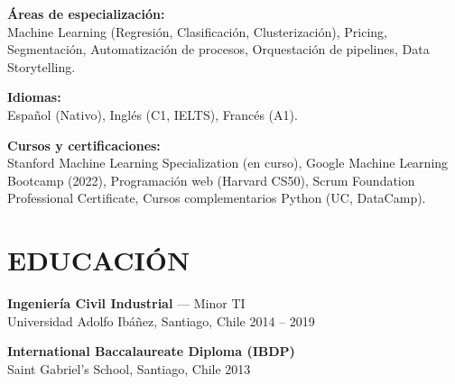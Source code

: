 \documentclass[a4paper,10.5pt]{extarticle}
\begin{document}
\vspace{4pt}

\textbf{Áreas de especialización:}\\
Machine Learning (Regresión, Clasificación, Clusterización), Pricing, Segmentación, Automatización de procesos, Orquestación de pipelines, Data Storytelling.

\vspace{4pt}

\textbf{Idiomas:}\\
Español (Nativo), Inglés (C1, IELTS), Francés (A1).

\vspace{4pt}

\textbf{Cursos y certificaciones:}\\
Stanford Machine Learning Specialization (en curso), Google Machine Learning Bootcamp (2022), Programación web (Harvard CS50), Scrum Foundation Professional Certificate, Cursos complementarios Python (UC, DataCamp).

\section*{EDUCACIÓN}

\textbf{Ingeniería Civil Industrial} --- Minor TI\\
Universidad Adolfo Ibáñez, Santiago, Chile \hfill 2014 -- 2019

\vspace{6pt}

\textbf{International Baccalaureate Diploma (IBDP)}\\
Saint Gabriel's School, Santiago, Chile \hfill 2013
\end{document}
